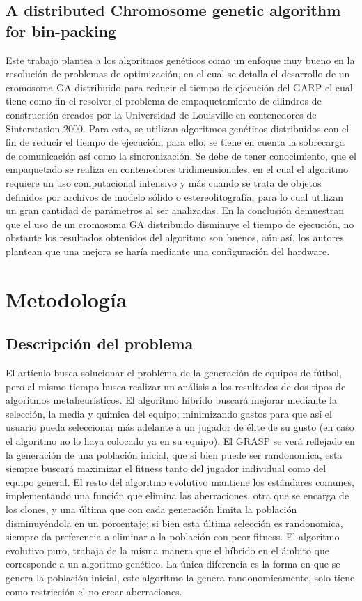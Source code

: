 \documentclass{article}
\begin{document}
\subsection{A distributed Chromosome genetic algorithm for bin-packing}
Este trabajo plantea a los algoritmos genéticos como un enfoque muy bueno en la resolución de problemas de optimización, en el cual se detalla el desarrollo de un cromosoma GA distribuido para reducir el tiempo de ejecución del GARP el cual tiene como fin el resolver el problema de empaquetamiento de cilindros de construcción creados por la Universidad de Louisville en contenedores de Sinterstation 2000.
Para esto, se utilizan algoritmos genéticos distribuidos con el fin de reducir el tiempo de ejecución, para ello, se tiene en cuenta la sobrecarga de comunicación así como la sincronización. 
Se debe de tener conocimiento, que el empaquetado se realiza en contenedores tridimensionales, en el cual el algoritmo requiere un uso computacional intensivo y más cuando se trata de objetos definidos por archivos de modelo sólido o estereolitografía, para lo cual utilizan un gran cantidad de parámetros al ser analizadas.
En la conclusión demuestran que el uso de un cromosoma GA distribuido disminuye el tiempo de ejecución, no obstante los resultados obtenidos del algoritmo son buenos, aún así, los autores plantean que una mejora se haría mediante una configuración del hardware.


\section{Metodología}
\subsection{Descripción del problema}
El artículo busca solucionar el problema de la generación de equipos de fútbol, pero al mismo tiempo busca realizar un análisis a los resultados de dos tipos de algoritmos metaheurísticos.\newline
El algoritmo híbrido buscará mejorar mediante la selección, la media y química del equipo; minimizando gastos para que así el usuario pueda seleccionar más adelante a un jugador de élite de su gusto (en caso el algoritmo no lo haya colocado ya en su equipo). El GRASP se verá reflejado en la generación de una población inicial, que si bien puede ser randonomica, esta siempre buscará maximizar el fitness tanto del jugador individual como del equipo general. El resto del algoritmo evolutivo mantiene los estándares comunes, implementando una función que elimina las aberraciones, otra que se encarga de los clones, y una última que con cada generación limita la población disminuyéndola en un porcentaje; si bien esta última selección es randonomica, siempre da preferencia a eliminar a la población con peor fitness. \newline
El algoritmo evolutivo puro, trabaja de la misma manera que el híbrido en el ámbito que corresponde a un algoritmo genético. La única diferencia es la forma en que se genera la población inicial, este algoritmo la genera randonomicamente, solo tiene como restricción el no crear aberraciones.
\end{document}

